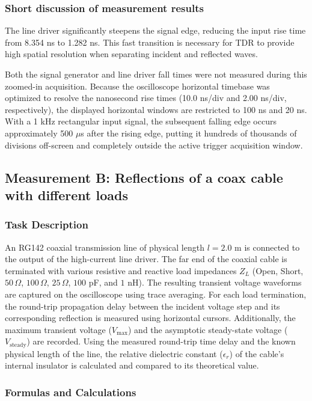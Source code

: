 \subsubsection{Short discussion of measurement results}

The line driver significantly steepens the signal edge, reducing the input rise time from 8.354 ns to 1.282 ns. This fast transition is necessary for TDR to provide high spatial resolution when separating incident and reflected waves.

Both the signal generator and line driver fall times were not measured during this zoomed-in acquisition. Because the oscilloscope horizontal timebase was optimized to resolve the nanosecond rise times (10.0 ns/div and 2.00 ns/div, respectively), the displayed horizontal windows are restricted to 100 ns and 20 ns. With a 1 kHz rectangular input signal, the subsequent falling edge occurs approximately 500 $\mu$s after the rising edge, putting it hundreds of thousands of divisions off-screen and completely outside the active trigger acquisition window.

\subsection{Measurement B: Reflections of a coax cable with different loads}

\subsubsection{Task Description}
An RG142 coaxial transmission line of physical length $l = 2.0$ m is connected to the output of the high-current line driver. The far end of the coaxial cable is terminated with various resistive and reactive load impedances $Z_L$ (Open, Short, $50\,\Omega$, $100\,\Omega$, $25\,\Omega$, $100$ pF, and $1$ nH). The resulting transient voltage waveforms are captured on the oscilloscope using trace averaging. For each load termination, the round-trip propagation delay between the incident voltage step and its corresponding reflection is measured using horizontal cursors. Additionally, the maximum transient voltage ($V_{\max}$) and the asymptotic steady-state voltage ($V_{\text{steady}}$) are recorded. Using the measured round-trip time delay and the known physical length of the line, the relative dielectric constant ($\epsilon_r$) of the cable's internal insulator is calculated and compared to its theoretical value.

\subsubsection{Formulas and Calculations}

